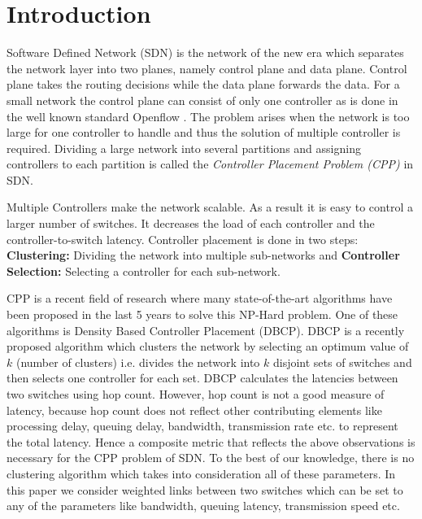 \documentclass[a4paper,twocolumn,preprint]{elsarticle}
\begin{document}

\section{Introduction}

Software Defined Network (SDN) is the network of the new era which separates the network layer into two planes, namely control plane and data plane. Control plane takes the routing decisions while the data plane forwards the data. For a small network the control plane can consist of only one controller as is done in the well known standard Openflow \cite{hu2014survey}. The problem arises when the network is too large for one controller to handle and thus the solution of multiple controller is required. Dividing a large network into several partitions and assigning controllers to each partition is called the \emph{Controller Placement Problem (CPP)} in SDN.

Multiple Controllers make the network scalable. As a result it is easy to control a larger number of switches. It decreases the load of each controller and the controller-to-switch latency. Controller placement is done in two steps:
\textbf{Clustering:} Dividing the network into multiple sub-networks and
\textbf{Controller Selection:} Selecting a controller for each sub-network.

CPP is a recent field of research where many state-of-the-art algorithms have been proposed in the last 5 years to solve this NP-Hard problem. One of these algorithms is Density Based Controller Placement (DBCP)\cite{dbcp2017}. DBCP is a recently proposed algorithm which clusters the network by selecting an optimum value of $k$ (number of clusters) i.e. divides the network into $k$ disjoint sets of switches and then selects one controller for each set. DBCP calculates the latencies between two switches using hop count. However, hop count is not a good measure of latency, because hop count does not reflect other contributing elements like processing delay, queuing delay, bandwidth, transmission rate etc. to represent the total latency. Hence a composite metric that reflects the above observations is necessary for the CPP problem of SDN. To the best of our knowledge, there is no clustering algorithm which takes into consideration all of these parameters. In this paper we consider weighted links between two switches which can be set to any of the parameters like bandwidth, queuing latency, transmission speed etc. 
\end{document}
